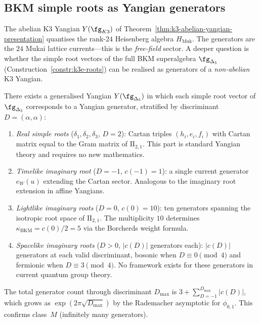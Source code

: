 
\subsection{BKM simple roots as Yangian generators}
\label{subsec:k3-bkm-yangian-generators}

The abelian K3 Yangian $Y(\fg_{K3})$ of Theorem~\ref{thm:k3-abelian-yangian-presentation} quantises the rank-$24$ Heisenberg algebra $H_{\mathrm{Muk}}$.  The generators are the $24$ Mukai lattice currents---this is the \emph{free-field} sector.  A deeper question is whether the simple root vectors of the full BKM superalgebra $\fg_{\Delta_5}$ (Construction~\ref{constr:k3e-roots}) can be realised as generators of a \emph{non-abelian} K3 Yangian.

\begin{conjecture}
\label{conj:bkm-yangian-generators}
\ClaimStatusConjectured
There exists a generalised Yangian $Y(\fg_{\Delta_5})$ in which each simple root vector of $\fg_{\Delta_5}$ corresponds to a Yangian generator, stratified by discriminant $D = (\alpha, \alpha)$:
\begin{enumerate}[label=\textup{(\roman*)}]
 \item \emph{Real simple roots} ($\delta_1, \delta_2, \delta_3$, $D = 2$): Cartan triples $(h_i, e_i, f_i)$ with Cartan matrix equal to the Gram matrix of $\mathrm{II}_{2,1}$.  This part is standard Yangian theory and requires no new mathematics.

 \item \emph{Timelike imaginary root} ($D = -1$, $c(-1) = 1$): a single current generator $e_W(u)$ extending the Cartan sector.  Analogous to the imaginary root extension in affine Yangians.

 \item \emph{Lightlike imaginary roots} ($D = 0$, $c(0) = 10$): ten generators spanning the isotropic root space of $\mathrm{II}_{2,1}$.  The multiplicity $10$ determines $\kappa_{\mathrm{BKM}} = c(0)/2 = 5$ via the Borcherds weight formula.

 \item \emph{Spacelike imaginary roots} ($D > 0$, $|c(D)|$ generators each): $|c(D)|$ generators at each valid discriminant, bosonic when $D \equiv 0 \pmod{4}$ and fermionic when $D \equiv 3 \pmod{4}$.  No framework exists for these generators in current quantum group theory.
\end{enumerate}
The total generator count through discriminant $D_{\max}$ is $3 + \sum_{D = -1}^{D_{\max}} |c(D)|$, which grows as $\exp(2\pi\sqrt{D_{\max}})$ by the Rademacher asymptotic for $\phi_{0,1}$.  This confirms class~$M$ (infinitely many generators).
\end{conjecture}

